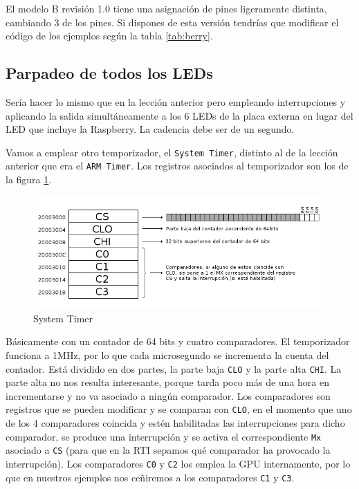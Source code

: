 El modelo B revisión 1.0 tiene una asignación de pines ligeramente distinta, cambiando 3 de
los pines. Si dispones de esta versión tendrías que modificar el código de los ejemplos
según la tabla \ref{tab:berry}.

\subsection{Parpadeo de todos los LEDs}

Sería hacer lo mismo que en la lección anterior pero empleando interrupciones y aplicando
la salida simultáneamente a los 6 LEDs de la placa externa en lugar del LED que incluye
la Raspberry. La cadencia debe ser de un segundo.

Vamos a emplear otro temporizador, el {\tt System Timer}, distinto al de la lección anterior
que era el {\tt ARM Timer}. Los registros asociados al temporizador son los de la figura
\ref{fig:systim}.

\begin{figure}[h]
  \centering
    \includegraphics[width=14cm]{graphs/systemtimer.png}
  \caption{System Timer}
  \label{fig:systim}
\end{figure}

Básicamente con un contador de 64 bits y cuatro comparadores. El temporizador funciona a 1MHz,
por lo que cada microsegundo se incrementa la cuenta del contador. Está dividido en dos partes,
la parte baja {\tt CLO} y la parte alta {\tt CHI}. La parte alta no nos resulta interesante,
porque tarda poco más de una hora en incrementarse y no va asociado a ningún comparador. Los
comparadores son registros que se pueden modificar y se comparan con {\tt CLO}, en el momento
que uno de los 4 comparadores coincida y estén habilitadas las interrupciones para dicho
comparador, se produce una interrupción y se activa el correspondiente {\tt Mx}
asociado a {\tt CS} (para que en la RTI sepamos qué comparador ha provocado la interrupción).
Los comparadores {\tt C0} y {\tt C2} los emplea la GPU internamente, por lo que en nuestros
ejemplos nos ceñiremos a los comparadores {\tt C1} y {\tt C3}.

